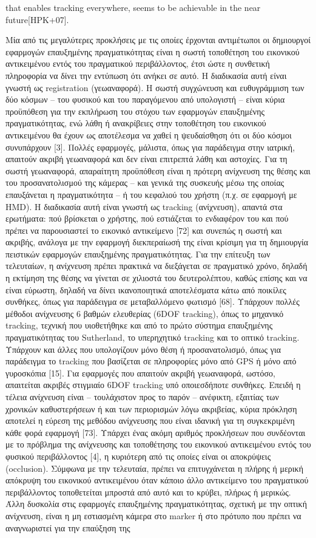 that enables tracking everywhere, seems to be achievable in the near future[HPK+07].


Μία από τις μεγαλύτερες προκλήσεις με τις οποίες έρχονται αντιμέτωποι οι δημιουργοί εφαρμογών επαυξημένης πραγματικότητας είναι η σωστή τοποθέτηση του εικονικού αντικειμένου εντός του πραγματικού περιβάλλοντος, έτσι ώστε η συνθετική πληροφορία να δίνει την εντύπωση ότι ανήκει σε αυτό. Η διαδικασία αυτή είναι γνωστή ως registration (γεωαναφορά). Η σωστή συγχώνευση και ευθυγράμμιση των δύο κόσμων – του φυσικού και του παραγόμενου από υπολογιστή – είναι κύρια προϋπόθεση για την εκπλήρωση του στόχου των εφαρμογών επαυξημένης πραγματικότητας, ενώ λάθη ή ανακρίβειες στην τοποθέτηση του εικονικού αντικειμένου θα έχουν ως αποτέλεσμα να χαθεί η ψευδαίσθηση ότι οι δύο κόσμοι συνυπάρχουν [3]. Πολλές εφαρμογές, μάλιστα, όπως για παράδειγμα στην ιατρική, απαιτούν ακριβή γεωαναφορά και δεν είναι επιτρεπτά λάθη και αστοχίες. Για τη σωστή γεωαναφορά, απαραίτητη προϋπόθεση είναι η πρότερη ανίχνευση της θέσης και του προσανατολισμού της κάμερας – και γενικά της συσκευής μέσω της οποίας επαυξάνεται η πραγματικότητα – ή του κεφαλιού του χρήστη (π.χ. σε εφαρμογή με HMD). Η διαδικασία αυτή είναι γνωστή ως tracking (ανίχνευση), απαντά στα ερωτήματα: πού βρίσκεται ο χρήστης, πού εστιάζεται το ενδιαφέρον του και πού πρέπει να παρουσιαστεί το εικονικό αντικείμενο [72] και συνεπώς η σωστή και ακριβής, ανάλογα με την εφαρμογή διεκπεραίωσή της είναι κρίσιμη για τη δημιουργία πειστικών εφαρμογών επαυξημένης πραγματικότητας. Για την επίτευξη των τελευταίων, η ανίχνευση πρέπει πρακτικά να διεξάγεται σε πραγματικό χρόνο, δηλαδή η εκτίμηση της θέσης να γίνεται σε χιλιοστά του δευτερολέπτου, καθώς επίσης και να είναι εύρωστη, δηλαδή να δίνει ικανοποιητικά αποτελέσματα κάτω από ποικίλες συνθήκες, όπως για παράδειγμα σε μεταβαλλόμενο φωτισμό [68]. Υπάρχουν πολλές μέθοδοι ανίχνευσης 6 βαθμών ελευθερίας (6DOF tracking), όπως το μηχανικό tracking, τεχνική που υιοθετήθηκε και από το πρώτο σύστημα επαυξημένης πραγματικότητας του Sutherland, το υπερηχητικό tracking και το οπτικό tracking. Υπάρχουν και άλλες που υπολογίζουν μόνο θέση ή προσανατολισμό, όπως για παράδειγμα το tracking που βασίζεται σε πληροφορίες μόνο από GPS ή μόνο από γυροσκόπια [15]. Για εφαρμογές που απαιτούν ακριβή γεωαναφορά, ωστόσο, απαιτείται ακριβές στιγμιαίο 6DOF tracking υπό οποιεσδήποτε συνθήκες. Επειδή η τέλεια ανίχνευση είναι – τουλάχιστον προς το παρόν – ανέφικτη, εξαιτίας των χρονικών καθυστερήσεων ή και των περιορισμών λόγω ακριβείας, κύρια πρόκληση αποτελεί η εύρεση της μεθόδου ανίχνευσης που είναι ιδανική για τη συγκεκριμένη κάθε φορά εφαρμογή [73]. Υπάρχει ένας ακόμη αριθμός προκλήσεων που συνδέονται με το πρόβλημα της ανίχνευσης και τοποθέτησης του εικονικού αντικειμένου εντός του φυσικού περιβάλλοντος [4], η κυριότερη από τις οποίες είναι οι αποκρύψεις (occlusion). Σύμφωνα με την τελευταία, πρέπει να επιτυγχάνεται η πλήρης ή μερική απόκρυψη του εικονικού αντικειμένου όταν κάποιο άλλο αντικείμενο του πραγματικού περιβάλλοντος τοποθετείται μπροστά από αυτό και το κρύβει, πλήρως ή μερικώς. Άλλη δυσκολία στις εφαρμογές επαυξημένης πραγματικότητας, σχετική με την οπτική ανίχνευση, είναι η μη εστιασμένη κάμερα στο marker ή στο πρότυπο που πρέπει να αναγνωριστεί για την επαύξηση της 